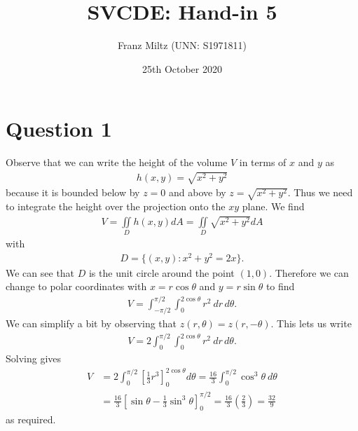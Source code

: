\documentclass{article}
\newcommand{\di}{\iint\limits}
\renewcommand{\t}{\theta}
\begin{document}
\title{SVCDE: Hand-in 5}
\author{Franz Miltz (UNN: S1971811)}
\date{25th October 2020}
\maketitle
\section*{Question 1}
Observe that we can write the height of the volume $V$ in terms of $x$ and $y$ as 
\begin{align*}
  h(x,y) = \sqrt{x^2 + y^2}
\end{align*}
because it is bounded below by $z=0$ and above by $z=\sqrt{x^2 + y^2}$.
Thus we need to integrate the height over the projection onto the $xy$ plane. We find
\begin{align*}
  V = \di_D h(x,y)dA = \di_D \sqrt{x^2+y^2}dA
\end{align*}
with
\begin{align*}
  D = \{(x,y) : x^2 + y^2 = 2x\}.
\end{align*}
We can see that $D$ is the unit circle around the point $(1,0)$. Therefore we can 
change to polar coordinates with $x=r\cos\t$ and $y=r\sin\t$ to find
\begin{align*}
  V = \int_{-\pi/2}^{\pi/2}\int_0^{2\cos\t} r^2\: dr\,d\t.
\end{align*}
We can simplify a bit by observing that $z(r,\t)=z(r,-\t)$. This lets us write
\begin{align*}
  V = 2\int_{0}^{\pi/2}\int_0^{2\cos \t} r^2\: dr\,d\t.
\end{align*}
Solving gives 
\begin{align*}
  V &= 2\int_0^{\pi/2}\left[\frac{1}{3}r^3\right]_0^{2\cos \t}d\t
  =\frac{16}{3}\int_0^{\pi/2}\cos^3 \t\:d\t\\
  &=\frac{16}{3}\left[\sin \t - \frac{1}{3}\sin^3 \t\right]_0^{\pi/2}
  =\frac{16}{3}\left(\frac{2}{3}\right) = \frac{32}{9}
\end{align*}
as required.
\end{document}
